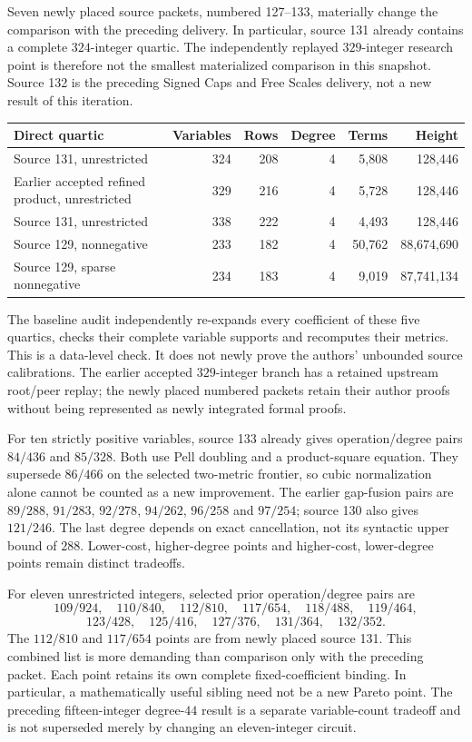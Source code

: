 \documentclass[11pt]{article}
\begin{document}
Seven newly placed source packets, numbered 127--133, materially change the
comparison with the preceding delivery. In particular, source 131 already
contains a complete $324$-integer quartic. The independently replayed
$329$-integer research point is therefore not the smallest materialized
comparison in this snapshot. Source 132 is the preceding Signed Caps and
Free Scales delivery, not a new result of this iteration.

\begin{center}\small
\begin{tabular}{lrrrrr}
\toprule
Direct quartic & Variables & Rows & Degree & Terms & Height\\
\midrule
Source 131, unrestricted &324&208&4&5,808&128,446\\
Earlier accepted refined product, unrestricted &329&216&4&5,728&128,446\\
Source 131, unrestricted &338&222&4&4,493&128,446\\
Source 129, nonnegative &233&182&4&50,762&88,674,690\\
Source 129, sparse nonnegative &234&183&4&9,019&87,741,134\\
\bottomrule
\end{tabular}
\end{center}
The baseline audit independently re-expands every coefficient of these five
quartics, checks their complete variable supports and recomputes their metrics.
This is a data-level check. It does not newly prove the authors' unbounded
source calibrations. The earlier accepted $329$-integer branch has a retained upstream
root/peer replay; the newly placed numbered packets retain their author proofs
without being represented as newly integrated formal proofs.

For ten strictly positive variables, source 133 already gives
operation/degree pairs $84/436$ and $85/328$. Both use Pell doubling and a
product-square equation. They supersede $86/466$ on the selected two-metric
frontier, so cubic normalization alone cannot be counted as a new improvement.
The earlier gap-fusion pairs are $89/288$, $91/283$, $92/278$,
$94/262$, $96/258$ and $97/254$; source 130 also gives $121/246$.
The last degree depends on exact cancellation, not its syntactic upper bound
of $288$. Lower-cost, higher-degree points and higher-cost, lower-degree
points remain distinct tradeoffs.

For eleven unrestricted integers, selected prior operation/degree pairs are
\[
 109/924,\quad110/840,\quad112/810,\quad117/654,\quad
 118/488,\quad119/464,
\]
\[
 123/428,\quad125/416,\quad127/376,\quad131/364,\quad132/352.
\]
The $112/810$ and $117/654$ points are from newly placed source 131.
This combined list is more demanding than comparison only with the preceding
packet. Each point retains its own complete fixed-coefficient binding.
In particular, a mathematically useful sibling need not be a new Pareto point.
The preceding fifteen-integer degree-$44$ result is a separate variable-count
tradeoff and is not superseded merely by changing an eleven-integer circuit.
\end{document}
